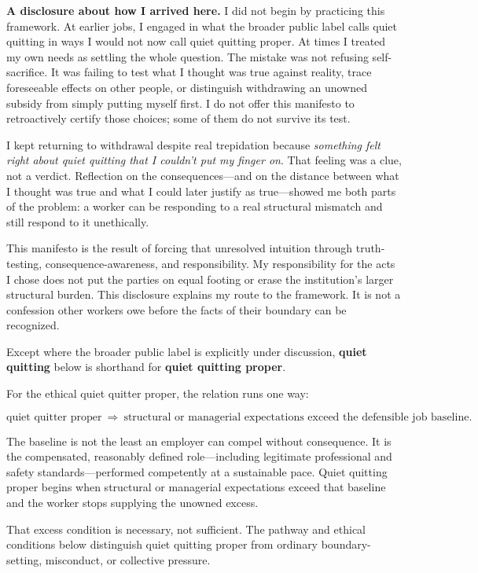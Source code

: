 \documentclass[11pt,oneside]{article}
\begin{document}
\textbf{A disclosure about how I arrived here.} I did not begin by
practicing this framework. At earlier jobs, I engaged in what the
broader public label calls quiet quitting in ways I would not now call
quiet quitting proper. At times I treated my own needs as settling the
whole question. The mistake was not refusing self-sacrifice. It was
failing to test what I thought was true against reality, trace
foreseeable effects on other people, or distinguish withdrawing an
unowned subsidy from simply putting myself first. I do not offer this
manifesto to retroactively certify those choices; some of them do not
survive its test.

I kept returning to withdrawal despite real trepidation because
\emph{something felt right about quiet quitting that I couldn't put my
finger on}. That feeling was a clue, not a verdict. Reflection on the
consequences---and on the distance between what I thought was true and
what I could later justify as true---showed me both parts of the
problem: a worker can be responding to a real structural mismatch and
still respond to it unethically.

This manifesto is the result of forcing that unresolved intuition
through truth-testing, consequence-awareness, and responsibility. My
responsibility for the acts I chose does not put the parties on equal
footing or erase the institution's larger structural burden. This
disclosure explains my route to the framework. It is not a confession
other workers owe before the facts of their boundary can be recognized.

Except where the broader public label is explicitly under discussion,
\textbf{quiet quitting} below is shorthand for \textbf{quiet quitting
proper}.

For the ethical quiet quitter proper, the relation runs one way:

\[
\boxed{\text{quiet quitter proper}\ \Longrightarrow\ \text{structural or managerial expectations exceed the defensible job baseline}.}
\]

The baseline is not the least an employer can compel without
consequence. It is the compensated, reasonably defined role---including
legitimate professional and safety standards---performed competently at
a sustainable pace. Quiet quitting proper begins when structural or
managerial expectations exceed that baseline and the worker stops
supplying the unowned excess.

That excess condition is necessary, not sufficient. The pathway and
ethical conditions below distinguish quiet quitting proper from ordinary
boundary-setting, misconduct, or collective pressure.
\end{document}
